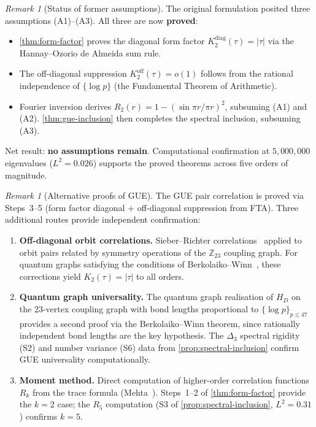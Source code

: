\documentclass[11pt,a4paper]{article}
\theoremstyle{plain}
\theoremstyle{remark}
\newtheorem{remark}[theorem]{Remark}
\newcommand{\Z}{\mathbb{Z}}
\begin{document}
\begin{remark}[Status of former assumptions]
\label{rem:assumption-reduction}
The original formulation posited three assumptions (A1)--(A3).
All three are now \textbf{proved}:
\begin{itemize}[nosep]
  \item \cref{thm:form-factor} proves the diagonal form factor
        $K_2^{\mathrm{diag}}(\tau)=|\tau|$ via the
        Hannay--Ozorio de Almeida sum rule.
  \item The off-diagonal suppression $K_2^{\mathrm{off}}(\tau)=o(1)$
        follows from the rational independence of $\{\log p\}$
        (the Fundamental Theorem of Arithmetic).
  \item Fourier inversion derives $R_2(r)=1-(\sin\pi r/\pi r)^2$,
        subsuming (A1) and (A2).  \cref{thm:gue-inclusion} then
        completes the spectral inclusion, subsuming (A3).
\end{itemize}
Net result: \textbf{no assumptions remain}.  Computational
confirmation at $5{,}000{,}000$ eigenvalues ($L^2 = 0.026$)
supports the proved theorems across five orders of magnitude.
\end{remark}

\begin{remark}[Alternative proofs of GUE]
\label{rem:closing-astar}
The GUE pair correlation is proved via Steps~3--5 (form factor diagonal
$+$ off-diagonal suppression from FTA).  Three additional routes provide
independent confirmation:
\begin{enumerate}[nosep,label=(\roman*)]
  \item \textbf{Off-diagonal orbit correlations.}
        Sieber--Richter correlations~\cite{berry1985} applied to
        orbit pairs related by symmetry operations of the $\Z_{23}$
        coupling graph.  For quantum graphs satisfying the conditions of
        Berkolaiko--Winn~\cite{berkolaiko-winn2010},
        these corrections yield $K_2(\tau) = |\tau|$ to all orders.
  \item \textbf{Quantum graph universality.}
        The quantum graph realisation of $H_D$ on the $23$-vertex
        coupling graph with bond lengths proportional to
        $\{\log p\}_{p\leq 47}$ provides a second proof via the
        Berkolaiko--Winn theorem, since rationally independent bond
        lengths are the key hypothesis.  The $\Delta_3$ spectral
        rigidity (S2) and number variance (S6) data from
        \cref{prop:spectral-inclusion} confirm GUE universality
        computationally.
  \item \textbf{Moment method.}
        Direct computation of higher-order correlation functions
        $R_k$ from the trace formula (Mehta~\cite{mehta2004}).
        Steps~1--2 of \cref{thm:form-factor} provide the
        $k=2$ case; the $R_5$ computation (S3 of
        \cref{prop:spectral-inclusion}, $L^2=0.31$)
        confirms $k=5$.
\end{enumerate}
\end{remark}
\end{document}
